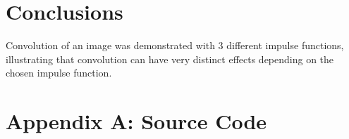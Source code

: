\documentclass{sydeStyle}
\begin{document}
\section*{Conclusions}
Convolution of an image was demonstrated with 3 different impulse functions,
illustrating that convolution can have very distinct effects depending on the
chosen impulse function.

\section*{Appendix A: Source Code}
\lstset{
	language=Octave,
	basicstyle=\scriptsize,
	tabsize=2,
	breaklines=true,
	breakatwhitespace=false,        %
	title=\lstname,
}





\end{document}
